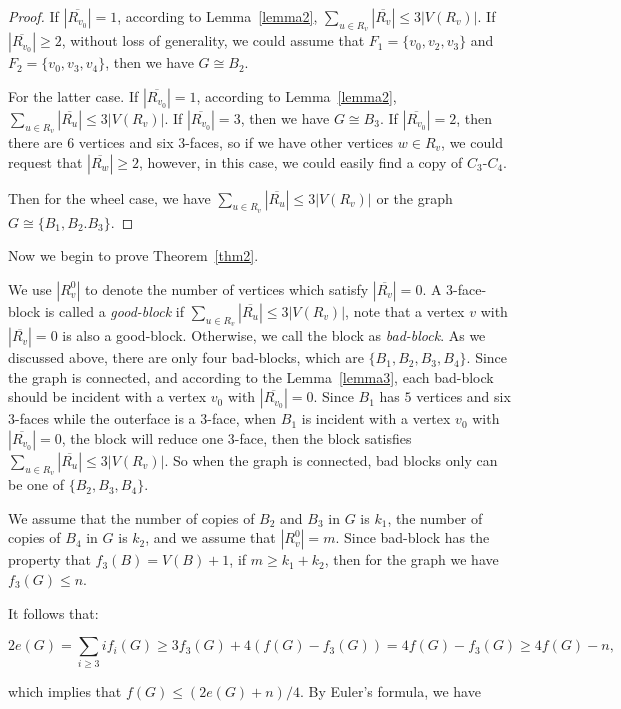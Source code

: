 \documentclass[12pt]{article}
\begin{document}
\begin{proof}
    If $|\overline{R_{v_0}}|=1$, according to Lemma~\ref{lemma2}, $\sum_{u \in R_v}|\overline{R_v}| \leq 3|V(R_v)|$. If $|\overline{R_{v_0}}|\geq2$, without loss of generality, we could assume that $F_1=\{v_0,v_2,v_3\}$ and $F_2=\{v_0,v_3,v_4\}$, then we have $G \cong B_2$.
    
    For the latter case. If $|\overline{R_{v_0}}|=1$, according to Lemma~\ref{lemma2}, $\sum_{u \in R_v}|\overline{R_u}| \leq 3|V(R_v)|$. If $|\overline{R_{v_0}}|=3$, then we have $G \cong B_3$. If $|\overline{R_{v_0}}|=2$, then there are $6$ vertices and six $3$-faces, so if we have other vertices $w \in R_v$, we could request that $|\overline{R_w}|\geq2$, however, in this case, we could easily find a copy of $C_3\text{-}C_4$. 
    
    Then for the wheel case, we have $\sum_{u \in R_v}|\overline{R_u}| \leq 3|V(R_v)|$ or the graph $G \cong \{B_1,B_2.B_3\}$.
    
\end{proof}

Now we begin to prove Theorem~\ref{thm2}.

We use $|R_v^0|$ to denote the number of vertices which satisfy $|\overline{R_v}|=0$. A $3$-face-block is called a \emph{good-block} if $\sum_{u \in R_v}|\overline{R_u}| \leq 3|V(R_v)|$, note that a vertex $v$ with $|\overline{R_v}|=0$ is also a good-block. Otherwise, we call the block as \emph{bad-block}. As we discussed above, there are only four bad-blocks, which are $\{ B_1,B_2,B_3,B_4\}$. Since the graph is connected, and according to the Lemma~\ref{lemma3}, each bad-block should be incident with a vertex $v_0$ with $|\overline{R_{v_0}}|=0$. Since $B_1$ has $5$ vertices and six $3$-faces while the outerface is a $3$-face, when $B_1$ is incident with a vertex $v_0$ with $|\overline{R_{v_0}}|=0$, the block will reduce one $3$-face, then the block satisfies $\sum_{u \in R_v}|\overline{R_u}| \leq 3|V(R_v)|$. So when the graph is connected, bad blocks only can be one of $\{ B_2,B_3,B_4\}$.

We assume that the number of copies of $B_2$ and $B_3$ in $G$ is $k_1$, the number of copies of $B_4$ in $G$ is $k_2$, and we assume that $|R_v^0|=m$. Since bad-block has the property that $f_3(B)=V(B)+1$, if $m \geq k_1+k_2$, then for the graph we have $f_3(G) \leq n$.

It follows that:

$$2e(G)=\sum_{i\geq3}if_i(G)\geq3f_3(G)+4(f(G)-f_3(G))=4f(G)-f_3(G)\geq4f(G)-n,$$

which implies that $f(G)\leq(2e(G)+n)/4$. By Euler’s formula, we have 
\end{document}
